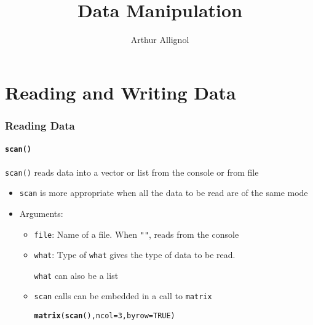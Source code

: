 \documentclass[paper=screen,mathserif]{beamer}\usepackage[]{graphicx}\usepackage[]{color}
\title[Data Manipulation]{Data Manipulation}
\author{Arthur Allignol}
\institute[]{\scriptsize{\url{arthur.allignol@uni-ulm.de}}}
\date{}
\makeatletter
\newcommand{\hlnum}[1]{\textcolor[rgb]{0.686,0.059,0.569}{#1}}%
\newcommand{\hlstd}[1]{\textcolor[rgb]{0.345,0.345,0.345}{#1}}%
\newcommand{\hlkwc}[1]{\textcolor[rgb]{0.333,0.667,0.333}{#1}}%
\newcommand{\hlkwd}[1]{\textcolor[rgb]{0.737,0.353,0.396}{\textbf{#1}}}%
\newenvironment{kframe}{%
 \def\at@end@of@kframe{}%
 \ifinner\ifhmode%
  \def\at@end@of@kframe{\end{minipage}}%
  \begin{minipage}{\columnwidth}%
 \fi\fi%
 \def\FrameCommand##1{\hskip\@totalleftmargin \hskip-\fboxsep
 \colorbox{shadecolor}{##1}\hskip-\fboxsep
     \hskip-\linewidth \hskip-\@totalleftmargin \hskip\columnwidth}%
 \MakeFramed {\advance\hsize-\width
   \@totalleftmargin\z@ \linewidth\hsize
   \@setminipage}}%
 {\par\unskip\endMakeFramed%
 \at@end@of@kframe}
\newenvironment{knitrout}{}{} %
\newcommand{\ft}[1]{\frametitle{#1}}
\newcommand{\fst}[1]{\framesubtitle{#1}}
\makeatother
\begin{document}
\newcommand{\titlep}{yes}  %

{
\renewcommand{\insertframenumber}{}   %
\begin{frame}
\addtocounter{framenumber}{-1}
\titlepage
\end{frame}
}



\section{Reading and Writing Data}

\begin{frame}[fragile]
  \ft{Reading Data} 
  \fst{{\tt scan()}}
    
  \verb=scan()= reads data into a vector or list from the console or
  from file
    
    \begin{itemize}
    \item \verb=scan= is more appropriate when all the data to be read
      are of the same mode
    \item Arguments:
      \begin{itemize}
      \item {\tt file}: Name of a file. When {\tt ""}, reads from the
        console
      \item {\tt what}: Type of {\tt what} gives the type of data to
        be read.
        
        {\tt what} can also be a list
      \item {\tt scan} calls can be embedded in a call to {\tt matrix}
\begin{knitrout}\scriptsize
{}\color{fgcolor}\begin{kframe}
\begin{alltt}
\hlkwd{matrix}\hlstd{(}\hlkwd{scan}\hlstd{(),} \hlkwc{ncol} \hlstd{=} \hlnum{3}\hlstd{,} \hlkwc{byrow} \hlstd{=} \hlnum{TRUE}\hlstd{)}
\end{alltt}
\end{kframe}
\end{knitrout}
\end{itemize}
\end{itemize}
\end{frame}
\end{document}
